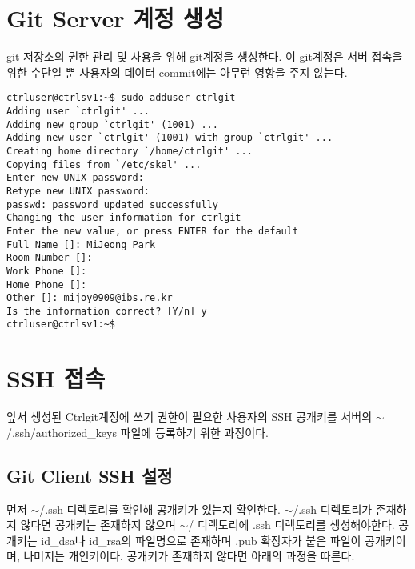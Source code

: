 \documentclass[11pt
  , a4paper
  , article
  , oneside
]{memoir}
\begin{document}
\chapter{Git Server 계정 생성}
git 저장소의 권한 관리 및 사용을 위해 git계정을 생성한다. 이 git계정은 서버 접속을 위한 수단일 뿐 사용자의 데이터 commit에는 아무런 영향을 주지 않는다.

\scriptsize
{
\begin{verbatim}
ctrluser@ctrlsv1:~$ sudo adduser ctrlgit
Adding user `ctrlgit' ...
Adding new group `ctrlgit' (1001) ...
Adding new user `ctrlgit' (1001) with group `ctrlgit' ...
Creating home directory `/home/ctrlgit' ...
Copying files from `/etc/skel' ...
Enter new UNIX password: 
Retype new UNIX password: 
passwd: password updated successfully
Changing the user information for ctrlgit
Enter the new value, or press ENTER for the default
Full Name []: MiJeong Park
Room Number []: 
Work Phone []: 
Home Phone []: 
Other []: mijoy0909@ibs.re.kr
Is the information correct? [Y/n] y
ctrluser@ctrlsv1:~$ 
\end{verbatim}
}

\chapter{SSH 접속}
앞서 생성된 Ctrlgit계정에 쓰기 권한이 필요한 사용자의 SSH 공개키를 서버의 $\sim$/.ssh/authorized\_keys 파일에 등록하기 위한 과정이다.

\section{Git Client SSH 설정}
먼저 $\sim$/.ssh 디렉토리를 확인해 공개키가 있는지 확인한다. $\sim$/.ssh 디렉토리가 존재하지 않다면 공개키는 존재하지 않으며 $\sim$/ 디렉토리에 .ssh 디렉토리를 생성해야한다. 공개키는 id\_dsa나 id\_rsa의 파일명으로 존재하며 .pub 확장자가 붙은 파일이 공개키이며, 나머지는 개인키이다. 공개키가 존재하지 않다면 아래의 과정을 따른다.
\end{document}
